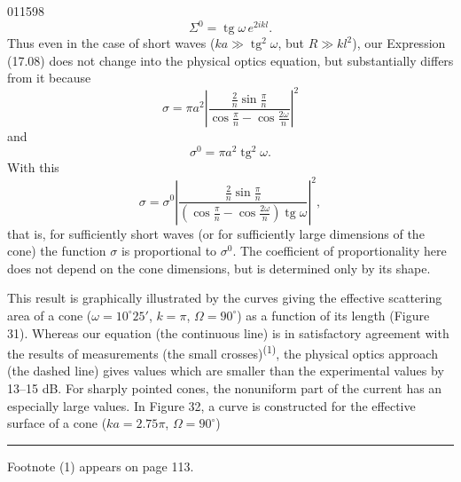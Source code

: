 \begin{scanpage}{0115}{98}
\[\Sigma^0=\operatorname{tg}\omega\,e^{2ikl}.\tag{17.12}\]
Thus even in the case of short waves ($ka\gg\operatorname{tg}^2\omega$, but $R\gg kl^2$), our Expression (17.08) does not change into the physical optics equation, but substantially differs from it because
\[\sigma=\pi a^2\left|\frac{\frac2n\sin\frac\pi n}{\cos\frac\pi n-\cos\frac{2\omega}n}\right|^2\tag{17.13}\]
and
\[\sigma^0=\pi a^2\operatorname{tg}^2\omega.\tag{17.14}\]
With this
\[\sigma=\sigma^0\left|\frac{\frac2n\sin\frac\pi n}{(\cos\frac\pi n-\cos\frac{2\omega}n)\operatorname{tg}\omega}\right|^2,\tag{17.15}\]
that is, for sufficiently short waves (or for sufficiently large dimensions of the cone) the function $\sigma$ is proportional to $\sigma^0$. The coefficient of proportionality here does not depend on the cone dimensions, but is determined only by its shape.

This result is graphically illustrated by the curves giving the effective scattering area of a cone ($\omega=10^\circ25'$, $k=\pi$, $\Omega=90^\circ$) as a function of its length (Figure 31). Whereas our equation (the continuous line) is in satisfactory agreement with the results of measurements (the small crosses)\textsuperscript{(1)}, the physical optics approach (the dashed line) gives values which are smaller than the experimental values by 13--15 dB. For sharply pointed cones, the nonuniform part of the current has an especially large values. In Figure 32, a curve is constructed for the effective surface of a cone ($ka=2.75\pi$, $\Omega=90^\circ$)

\vfill\noindent\rule{.5\linewidth}{.4pt}

Footnote (1) appears on page 113.
\end{scanpage}
